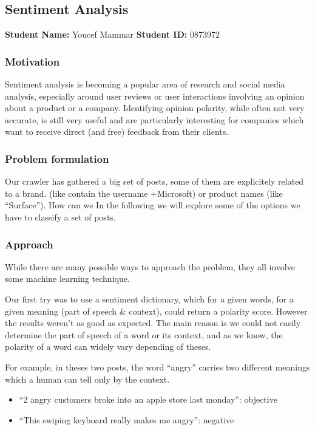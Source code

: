 \subsection{Sentiment Analysis}
\textbf{Student Name: }Youcef Mammar \textbf{Student ID:} 0873972\\

\subsubsection*{Motivation}
Sentiment analysis is becoming a popular area of research and social media analysis,
especially around user reviews or user interactions involving an opinion about a product
or a company. Identifying opinion polarity, while often not very accurate, is still very
useful and are particularly interesting for companies which want to receive direct (and free)
feedback from their clients.

\subsubsection*{Problem formulation}
Our crawler has gathered a big set of posts, some of them are explicitely related to a brand.
(like contain the username +Microsoft) or product names (like “Surface”). How can we
In the following we will explore some of the options we have to classify a set of posts.



\subsubsection*{Approach}

While there are many possible ways to approach the problem, they all involve some machine learning technique.

Our first try was to use a sentiment dictionary, which for a given words, for a given meaning (part of speech \&
context), could return a polarity score. However the results weren’t as good as expected. The main reason is we
could not easily determine the part of speech of a word or its context, and as we know, the polarity of a word can widely vary depending of theses.

For example, in theses two posts, the word “angry” carries two different meanings which a human can tell only by the context.
\begin{itemize}
 \item ``2 angry customers broke into an apple store last monday'': objective
 \item ``This swiping keyboard really makes me angry'': negative

\end{itemize}


